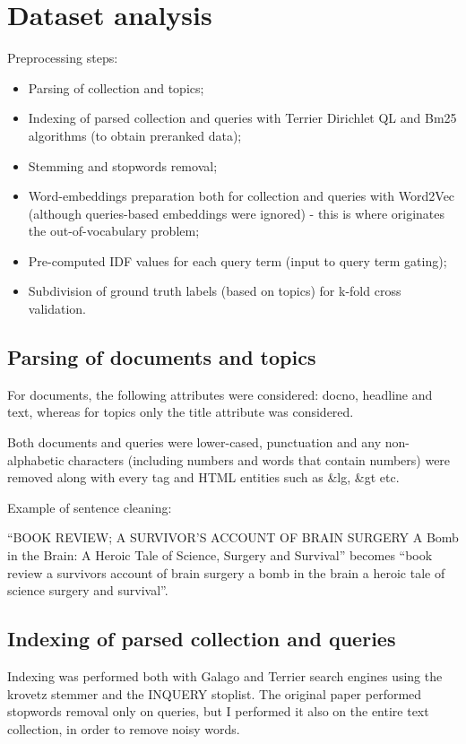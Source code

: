 \section{Dataset analysis}

Preprocessing steps:

\begin{itemize}
\item Parsing of collection and topics;
\item Indexing of parsed collection and queries with Terrier Dirichlet QL and Bm25 algorithms (to obtain preranked data);
\item Stemming and stopwords removal;
\item Word-embeddings preparation both for collection and queries with Word2Vec (although queries-based embeddings were ignored) - this is where originates the out-of-vocabulary problem;
\item Pre-computed IDF values for each query term (input to query term gating);
\item Subdivision of ground truth labels (based on topics) for k-fold cross validation.
\end{itemize}

\subsection{Parsing of documents and topics}

For documents, the following attributes were considered: docno, headline and text, whereas for topics only the title attribute was considered.

Both documents and queries were lower-cased, punctuation and any non-alphabetic characters (including numbers and words that contain numbers) were removed along with every tag and HTML entities such as \&lg, \&gt etc.

Example of sentence cleaning:

``BOOK REVIEW; A SURVIVOR'S ACCOUNT OF BRAIN SURGERY A Bomb in the Brain: A Heroic Tale of Science, Surgery and Survival'' becomes ``book review a survivors account of brain surgery a bomb in the brain a heroic tale of science surgery and survival''.

\subsection{Indexing of parsed collection and queries}

Indexing was performed both with Galago and Terrier search engines using the krovetz stemmer and the INQUERY stoplist. The original paper performed stopwords removal only on queries, but I performed it also on the entire text collection, in order to remove noisy words.

